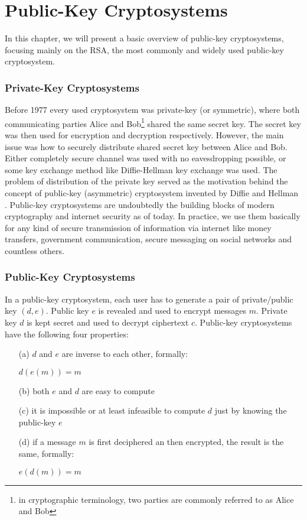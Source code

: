 \chapter{Public-Key Cryptosystems}
\label{chapter-rsa}

In this chapter, we will present a basic overview of public-key cryptosystems, focusing mainly on the RSA, the most commonly and widely used public-key cryptosystem.

\subsection*{Private-Key Cryptosystems}

Before 1977 every used cryptosystem was private-key (or symmetric), where both communicating parties Alice and Bob\footnote{in cryptographic terminology, two parties are commonly referred to as Alice and Bob} shared the same secret key. The secret key was then used for encryption and decryption respectively. However, the main issue was how to securely distribute shared secret key between Alice and Bob. Either completely secure channel was used with no eavesdropping possible, or some key exchange method like Diffie-Hellman key exchange\cite{diffie_hellman} was used. The problem of distribution of the private key served as the motivation behind the concept of public-key (asymmetric) cryptosystem invented by Diffie and Hellman \cite{diffie_hellman}. Public-key cryptosystems are undoubtedly the building blocks of modern cryptography and internet security as of today. In practice, we use them basically for any kind of secure transmission of information via internet like money transfers, government communication, secure messaging on social networks and countless others.

\subsection*{Public-Key Cryptosystems}

In a public-key cryptosystem, each user has to generate a pair of private/public key $(d,e)$. Public key $e$ is revealed and used to encrypt messages $m$. Private key $d$ is kept secret and used to decrypt ciphertext $c$. Public-key cryptosystems have the following four properties:

\begin{itemize}

	\item[(a)] $d$ and $e$ are inverse to each other, formally:

$d(e(m)) = m$

	\item[(b)] both $e$ and $d$ are easy to compute

	\item[(c)] it is impossible or at least infeasible to compute $d$ just by knowing the public-key $e$

	\item[(d)] if a message $m$ is first deciphered an then encrypted, the result is the same, formally:
    
$e(d(m)) = m$

\end{itemize}

